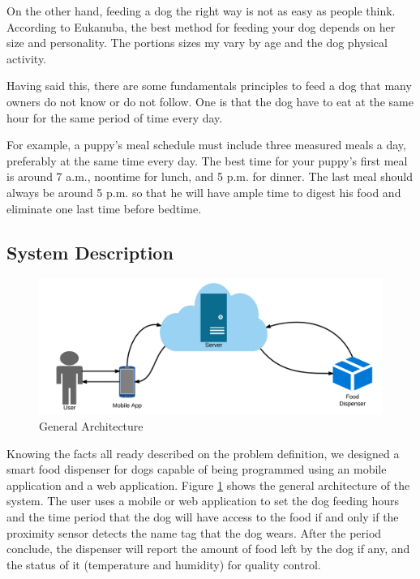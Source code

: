 \documentclass[12pt]{article}
\begin{document}
On the other hand, feeding a dog the right way is not as easy as people think. According to Eukanuba\cite{Eukanuba2016}, the best method for feeding your dog depends on her size and personality. The portions sizes my vary by age and the dog physical activity.

Having said this, there are some fundamentals principles to feed a dog that many owners do not know or do not follow. One is that the dog have to eat at the same hour for the same period of time every day.

For example, a puppy’s meal schedule must include three measured meals a day, preferably at the same time every day. The best time for your puppy’s first meal is around 7 a.m., noontime for lunch, and 5 p.m. for dinner. The last meal should always be around 5 p.m. so that he will have ample time to digest his food and eliminate one last time before bedtime.

\subsection{System Description}

\begin{figure}[!htb]
  \includegraphics[width=\textwidth]{Figures/GeneralArchitecture}
  \caption{General Architecture}
  \label{fig:GeneralArchitecture}
\end{figure}

Knowing the facts all ready described on the problem definition, we designed a smart food dispenser for dogs capable of being programmed using an mobile application and a web application. Figure \ref{fig:GeneralArchitecture} shows the general architecture of the system. The user uses a mobile or web application to set the dog feeding hours and the time period that the dog will have access to the food if and only if the proximity sensor detects the name tag that the dog wears. After the period conclude, the dispenser will report the amount of food left by the dog if any, and the status of it (temperature and humidity) for quality control.
\end{document}
